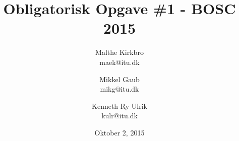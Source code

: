 \documentclass{article}
\begin{document}
	\title{\textbf{\huge{Obligatorisk Opgave \#1 - BOSC 2015}}}
	\author{
		Malthe Kirkbro\\
		maek@itu.dk
		\and
		Mikkel Gaub\\
		mikg@itu.dk
		\and
		Kenneth Ry Ulrik\\
		kulr@itu.dk
	}
	\date{Oktober 2, 2015}
	\maketitle
	
	\tableofcontents

	\newpage

	

	

	

	

	

	

	
\end{document}
